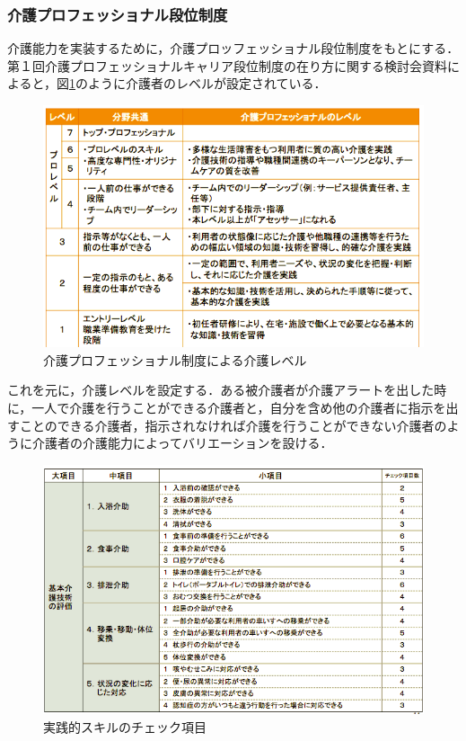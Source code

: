 \subsubsection{介護プロフェッショナル段位制度}

介護能力を実装するために，介護プロッフェッショナル段位制度\cite{kentoukai}をもとにする．第１回介護プロフェッショナルキャリア段位制度の在り方に関する検討会資料によると，図\ref{kaigo_professional}のように介護者のレベルが設定されている．

\begin{figure}[htb]
 \begin{center}
 \includegraphics[scale=0.4]{figures/kaigo_professional.png}
 \caption[介護プロフェッショナル制度による介護レベル]{介護プロフェッショナル制度による介護レベル \label{kaigo_professional}}
 \end{center}
\end{figure}

これを元に，介護レベルを設定する．ある被介護者が介護アラートを出した時に，一人で介護を行うことができる介護者と，自分を含め他の介護者に指示を出すことのできる介護者，指示されなければ介護を行うことができない介護者のように介護者の介護能力によってバリエーションを設ける．

\begin{figure}[htb]
 \begin{center}
 \includegraphics[scale=0.4]{figures/practical_skill}
 \caption[実践的スキルのチェック項目]{実践的スキルのチェック項目 \label{practical_skill}}
 \end{center}
\end{figure}

